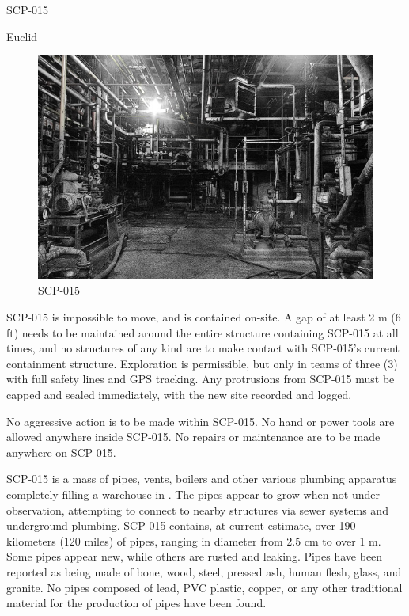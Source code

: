 
 SCP-015

 Euclid

\begin{figure}[h]
\begin{center}
\includegraphics[scale=0.4]{scp/015.jpg}
\linebreak SCP-015
\end{center}
\end{figure}

 SCP-015 is impossible to move, and is contained on-site. A gap of at least 2 m (6 ft) needs to be maintained around the entire structure containing SCP-015 at all times, and no structures of any kind are to make contact with SCP-015's current containment structure. Exploration is permissible, but only in teams of three (3) with full safety lines and GPS tracking. Any protrusions from SCP-015 must be capped and sealed immediately, with the new site recorded and logged.

No aggressive action is to be made within SCP-015. No hand or power tools are allowed anywhere inside SCP-015. No repairs or maintenance are to be made anywhere on SCP-015.

 SCP-015 is a mass of pipes, vents, boilers and other various plumbing apparatus completely filling a warehouse in . The pipes appear to grow when not under observation, attempting to connect to nearby structures via sewer systems and underground plumbing. SCP-015 contains, at current estimate, over 190 kilometers (120 miles) of pipes, ranging in diameter from 2.5 cm to over 1 m. Some pipes appear new, while others are rusted and leaking. Pipes have been reported as being made of bone, wood, steel, pressed ash, human flesh, glass, and granite. No pipes composed of lead, PVC plastic, copper, or any other traditional material for the production of pipes have been found.

